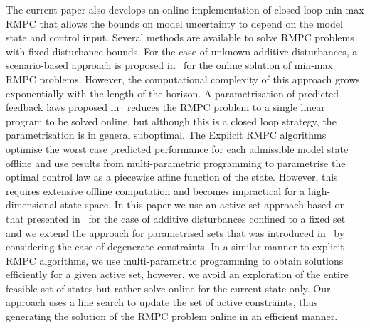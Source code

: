 \documentclass[journal]{IEEEtran}
\theoremstyle{remark}
\theoremstyle{definition}
\begin{document}
The current paper also develops an online implementation of closed loop min-max RMPC that allows the bounds on model uncertainty to depend on the model state and control input.
%
Several methods are available to solve RMPC problems with fixed disturbance bounds. For the case of unknown additive disturbances, 
a scenario-based approach is proposed in~\cite{Scokaert:1998} for the online solution of min-max RMPC problems. However, the computational complexity of this approach grows exponentially with the length of the horizon. 
%
A parametrisation of predicted feedback laws proposed in~\cite{Rakovic:2012} reduces the RMPC problem to a single linear 
program to be solved online, but although this is a closed loop strategy, the parametrisation is in general 
suboptimal. 
%
The Explicit RMPC algorithms~\cite{Bemporad:2003,Diehl:2004} optimise the worst case predicted performance for each admissible model state offline and
use results from multi-parametric programming to parametrise the optimal control law as a piecewise affine function of the
state.
%
However, this requires extensive offline computation and becomes impractical for a high-dimensional state space.
%
In this paper we use an active set approach based on that presented in~\cite{Buerger:ACC,Buerger:IJRNC} for the case of additive disturbances confined to a fixed set and we extend the approach for parametrised sets that was introduced in~\cite{Schaich:NMPC:2015} by considering the case of degenerate constraints.
%
In a similar manner to explicit RMPC algorithms, we use multi-parametric programming to obtain solutions efficiently
for a given active set, however, we avoid an exploration of the entire feasible set of states but rather solve online for the current state only.
%
Our approach uses a line search to update the set of active constraints, thus generating
the solution of the RMPC problem online in an efficient manner.
\end{document}

